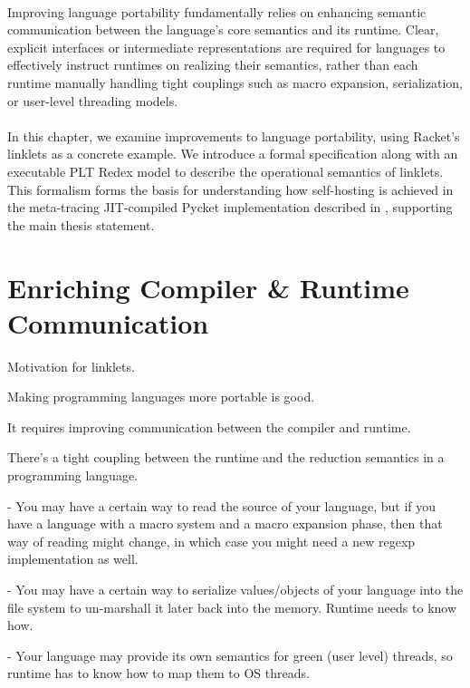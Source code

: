 	\paragraph{}%
  		Improving language portability fundamentally relies on enhancing semantic communication between the language's core semantics and its runtime. Clear, explicit interfaces or intermediate representations are required for languages to effectively instruct runtimes on realizing their semantics, rather than each runtime manually handling tight couplings such as macro expansion, serialization, or user-level threading models.

	\paragraph{}%
		In this chapter, we examine improvements to language portability, using Racket's linklets as a concrete example. We introduce a formal specification along with an executable PLT Redex model to describe the operational semantics of linklets. This formalism forms the basis for understanding how self-hosting is achieved in the meta-tracing JIT-compiled Pycket implementation described in , supporting the main thesis statement.


	\section[\texorpdfstring{Enriching Compiler \& Runtime Communication}{Motivation for Linklets}]{Enriching Compiler \& Runtime Communication}

		\begin{mainpoint}
			Motivation for linklets.

			Making programming languages more portable is good.

			It requires improving communication between the compiler and runtime.
		\end{mainpoint}

		\begin{paragraph-here}
			There's a tight coupling between the runtime and the reduction semantics in a programming language.

				- You may have a certain way to read the source of your language, but if you have a language with a macro system and a macro expansion phase, then that way of reading might change, in which case you might need a new regexp implementation as well.

				- You may have a certain way to serialize values/objects of your language into the file system to un-marshall it later back into the memory. Runtime needs to know how.

				- Your language may provide its own semantics for green (user level) threads, so runtime has to know how to map them to OS threads.
		\end{paragraph-here}

